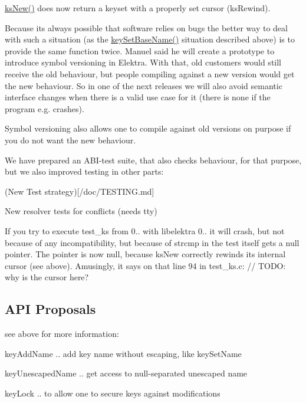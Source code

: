 \hyperlink{group__keyset_ga671e1aaee3ae9dc13b4834a4ddbd2c3c}{ks\+New()} does now return a keyset with a properly set cursor (ks\+Rewind).

Because its always possible that software relies on bugs the better way to deal with such a situation (as the \hyperlink{group__keyname_ga6e804bd453f98c28b0ff51430d1df407}{key\+Set\+Base\+Name()} situation described above) is to provide the same function twice. Manuel said he will create a prototype to introduce symbol versioning in Elektra. With that, old customers would still receive the old behaviour, but people compiling against a new version would get the new behaviour. So in one of the next releases we will also avoid semantic interface changes when there is a valid use case for it (there is none if the program e.\+g. crashes).

Symbol versioning also allows one to compile against old versions on purpose if you do not want the new behaviour.

We have prepared an A\+B\+I-\/test suite, that also checks behaviour, for that purpose, but we also improved testing in other parts\+:


\begin{DoxyItemize}
\item (New Test strategy)\mbox{[}/doc/\+T\+E\+S\+T\+I\+NG.md\mbox{]}
\item New resolver tests for conflicts (needs tty)
\end{DoxyItemize}

If you try to execute test\+\_\+ks from 0.. with libelektra 0.. it will crash, but not because of any incompatibility, but because of {\ttfamily strcmp} in the test itself gets a null pointer. The pointer is now null, because ks\+New correctly rewinds its internal cursor (see above). Amusingly, it says on that line 94 in test\+\_\+ks.\+c\+: // T\+O\+DO\+: why is the cursor here?

\subsection*{A\+PI Proposals}

see above for more information\+:


\begin{DoxyItemize}
\item {\ttfamily key\+Add\+Name} .. add key name without escaping, like key\+Set\+Name
\item {\ttfamily key\+Unescaped\+Name} .. get access to null-\/separated unescaped name
\item {\ttfamily key\+Lock} .. to allow one to secure keys against modifications
\end{DoxyItemize}

